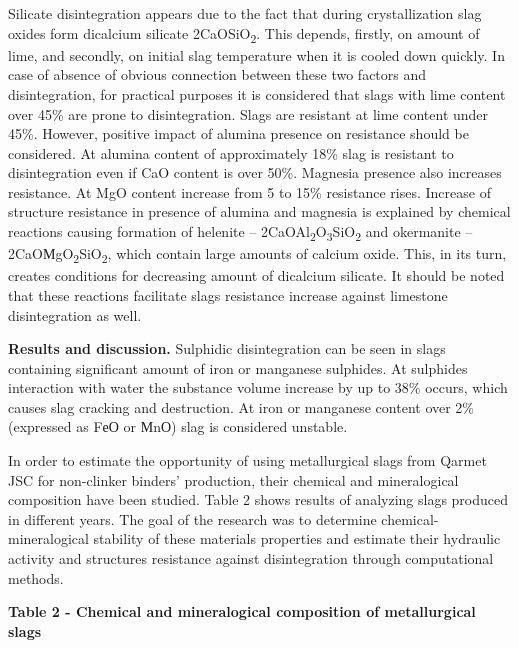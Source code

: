Silicate disintegration appears due to the fact that during
crystallization slag oxides form dicalcium silicate
2CaOSiO\textsubscript{2}. This depends, firstly, on amount of lime, and
secondly, on initial slag temperature when it is cooled down quickly. In
case of absence of obvious connection between these two factors and
disintegration, for practical purposes it is considered that slags with
lime content over 45\% are prone to disintegration. Slags are resistant
at lime content under 45\%. However, positive impact of alumina presence
on resistance should be considered. At alumina content of approximately
18\% slag is resistant to disintegration even if CaO content is over
50\%. Magnesia presence also increases resistance. At MgO content
increase from 5 to 15\% resistance rises. Increase of structure
resistance in presence of alumina and magnesia is explained by chemical
reactions causing formation of helenite --
2CaOAl\textsubscript{2}O\textsubscript{3}SiO\textsubscript{2} and
okermanite -- 2CaOМgO\textsubscript{2}SiO\textsubscript{2}, which
contain large amounts of calcium oxide. This, in its turn, creates
conditions for decreasing amount of dicalcium silicate. It should be
noted that these reactions facilitate slags resistance increase against
limestone disintegration as well.

{\bfseries Results and discussion.} Sulphidic disintegration can be seen in
slags containing significant amount of iron or manganese sulphides. At
sulphides\textquotesingle{} interaction with water the substance volume
increase by up to 38\% occurs, which causes slag cracking and
destruction. At iron or manganese content over 2\% (expressed as FеО or
МnО) slag is considered unstable.

In order to estimate the opportunity of using metallurgical slags from
Qarmet JSC for non-clinker binders' production, their chemical and
mineralogical composition have been studied. Table 2 shows results of
analyzing slags produced in different years. The goal of the research
was to determine chemical-mineralogical stability of these
materials\textquotesingle{} properties and estimate their hydraulic
activity and structure\textquotesingle s resistance against
disintegration through computational methods.

{\bfseries Table 2 - Chemical and mineralogical composition of
metallurgical slags}

